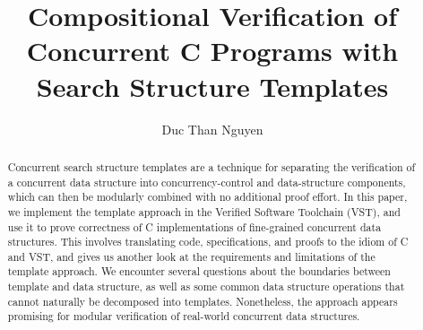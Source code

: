 \documentclass[sigplan,10pt,anonymous,review]{acmart}\settopmatter{printfolios=true,printccs=false,printacmref=false}
\begin{document}
\title{Compositional Verification of Concurrent C Programs with Search Structure Templates}

\author{Duc Than Nguyen}
\orcid{}


\begin{abstract}
Concurrent search structure templates are a technique for separating the verification of a concurrent data structure into concurrency-control and data-structure components, which can then be modularly combined with no additional proof effort. In this paper, we implement the template approach in the Verified Software Toolchain (VST), and use it to prove correctness of C implementations of fine-grained concurrent data structures. This involves translating code, specifications, and proofs to the idiom of C and VST, and gives us another look at the requirements and limitations of the template approach.
We encounter several questions about the boundaries between template and data structure, as well as some common data structure operations that cannot naturally be decomposed into templates. Nonetheless, the approach appears promising for modular verification of real-world concurrent data structures.
\end{abstract}


\keywords{}
\end{document}
